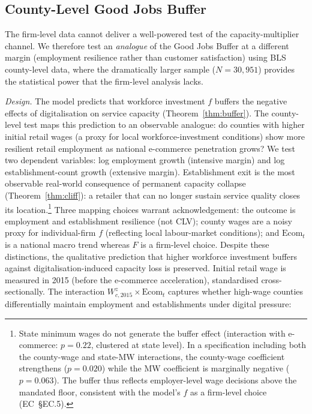 \documentclass[msom,dblanonrev]{informs4}
\begin{document}
\subsection{County-Level Good Jobs Buffer}\label{sec:emp:county}

The firm-level data cannot deliver a well-powered test of the capacity-multiplier channel. We therefore test an \emph{analogue} of the Good Jobs Buffer at a different margin (employment resilience rather than customer satisfaction) using BLS county-level data, where the dramatically larger sample ($N = 30{,}951$) provides the statistical power that the firm-level analysis lacks.

\textit{Design.} The model predicts that workforce investment $f$ buffers the negative effects of digitalisation on service capacity (Theorem~\ref{thm:buffer}). The county-level test maps this prediction to an observable analogue: do counties with higher initial retail wages (a proxy for local workforce-investment conditions) show more resilient retail employment as national e-commerce penetration grows? We test two dependent variables: log employment growth (intensive margin) and log establishment-count growth (extensive margin). Establishment exit is the most observable real-world consequence of permanent capacity collapse (Theorem~\ref{thm:cliff}): a retailer that can no longer sustain service quality closes its location.\footnote{State minimum wages do not generate the buffer effect (interaction with e-commerce: $p = 0.22$, clustered at state level). In a specification including both the county-wage and state-MW interactions, the county-wage coefficient strengthens ($p = 0.020$) while the MW coefficient is marginally negative ($p = 0.063$). The buffer thus reflects employer-level wage decisions above the mandated floor, consistent with the model's $f$ as a firm-level choice (EC~\S EC.5).} Three mapping choices warrant acknowledgement: the outcome is employment and establishment resilience (not CLV); county wages are a noisy proxy for individual-firm $f$ (reflecting local labour-market conditions); and $\text{Ecom}_t$ is a national macro trend whereas $F$ is a firm-level choice. Despite these distinctions, the qualitative prediction that higher workforce investment buffers against digitalisation-induced capacity loss is preserved. Initial retail wage is measured in 2015 (before the e-commerce acceleration), standardised cross-sectionally. The interaction $W_{c,2015}^z \times \text{Ecom}_t$ captures whether high-wage counties differentially maintain employment and establishments under digital pressure:
\end{document}
